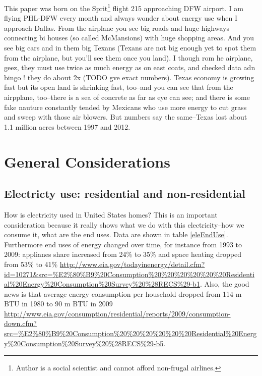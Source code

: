 \documentclass[10pt, letterpaper]{article}
\begin{document}
\begin{spacing}{1.4}
This paper was born on the Sprit\footnote{Author is a social scientist and
  cannot afford non-frugal airlines.} flight 215 approaching DFW airport. I am
flying PHL-DFW every month and always wonder about energy use when I approach
Dallas. From the airplane you see big roads and huge highways connecting bi
houses (so called McMansions) with huge shopping areas. And you see big cars and
in them big Texans (Texans are not big enough yet to spot them from the
airplane, but you'll see them once you land). I though rom he airplane, geez,
they must use twice as much energy as on east coats, and checked data adn bingo
! they do about 2x (TODO gve exact numbers). 
Texas economy is growing fast but its open land is shrinking fast, too--and you
can see that from the airpplane, too--there is a sea of concrete as far as eye
can see; and there is some fake nauture constantly tended by Mexicans who use
more energy to cut grass and sweep with those air blowers. But numbers say the
same--Texas lost about 1.1 million acres between 1997 and 2012. 
\cite{marshallCL14}


\section{General Considerations}

\subsection{Electricty use: residential and non-residential} 
How is electricity used in United States homes? This is an important
consideration because it really shows what we do with this electricity--how we
consume it, what are the end uses. Data are shown in table
\ref{eleEndUse}. Furthermore end uses of energy changed over time, for instance
 from 1993 to 2009: applianes share increased from 24\% to 35\% and space
 heating dropped from 53\% to 41\%
 \url{http://www.eia.gov/todayinenergy/detail.cfm?id=10271&src=%E2%80%B9%20Consumption%20%20%20%20%20%20Residential%20Energy%20Consumption%20Survey%20%28RECS%29-b1}. 
Also, the good news is that average energy consumption per household dropped from 114 m BTU in 1980 to
90 m BTU in 2009 \url{http://www.eia.gov/consumption/residential/reports/2009/consumption-down.cfm?src=%E2%80%B9%20Consumption%20%20%20%20%20%20Residential%20Energy%20Consumption%20Survey%20%28RECS%29-b5}.  



\end{spacing}
\end{document}
